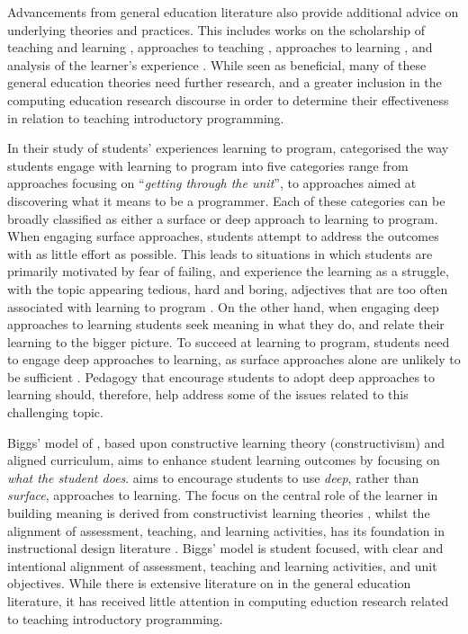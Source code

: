 Advancements from general education literature also provide additional advice on underlying theories and practices. This includes works on the scholarship of teaching and learning \cite{Boyer:1990}, approaches to teaching \cite{Martin:2000}, approaches to learning \cite{Marton:1976a,Entwistle:1991,Trigwell:1991,Trigwell:1999,Marton:2005}, and analysis of the learner's experience \cite{Marton:1997}. While seen as beneficial, many of these general education theories need further research, and a greater inclusion in the computing education research discourse in order to determine their effectiveness in relation to teaching introductory programming.

 In their study of students' experiences learning to program, \citet{Bruce:2003} categorised the way students engage with learning to program into five categories range from approaches focusing on ``\emph{getting through the unit}'', to approaches aimed at discovering what it means to be a programmer. Each of these categories can be broadly classified as either a surface or deep approach to learning \cite{Marton:1976a,Ramsden:1992} to program. When engaging surface approaches, students attempt to address the outcomes with as little effort as possible. This leads to situations in which students are primarily motivated by fear of failing, and experience the learning as a struggle, with the topic appearing tedious, hard and boring, adjectives that are too often associated with learning to program \cite{McGettrick:2005}. On the other hand, when engaging deep approaches to learning students seek meaning in what they do, and relate their learning to the bigger picture. To succeed at learning to program, students need to engage deep approaches to learning, as surface approaches alone are unlikely to be sufficient \cite{Bruce:2003}. Pedagogy that encourage students to adopt deep approaches to learning should, therefore, help address some of the issues related to this challenging topic.

Biggs' model of \CA \cite{Biggs:1996c,Biggs:2007}, based upon constructive learning theory (constructivism) and aligned curriculum, aims to enhance student learning outcomes by focusing on \emph{what the student does}. \CA aims to encourage students to use \emph{deep}, rather than \emph{surface}, approaches to learning. The focus on the central role of the learner in building meaning is derived from constructivist learning theories , whilst the alignment of assessment, teaching, and learning activities, has its foundation in instructional design literature \cite{Cohen:1987} . Biggs' model is student focused, with clear and intentional alignment of assessment, teaching and learning activities, and unit objectives. While there is extensive literature on \CA in the general education literature, it has received little attention in computing eduction research related to teaching introductory programming. 

